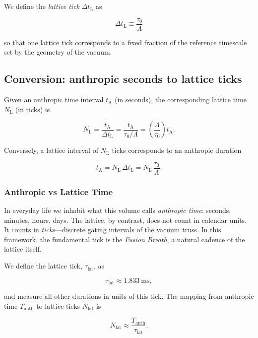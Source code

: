 \documentclass[11pt, letterpaper, openany]{book}
\begin{document}
We define the \emph{lattice tick} $\Delta t_{\text{L}}$ as


\[
\Delta t_{\text{L}} \equiv \frac{\tau_0}{\Lambda}
\]


so that one lattice tick corresponds to a fixed fraction of the reference
timescale set by the geometry of the vacuum.

\subsection{Conversion: anthropic seconds to lattice ticks}

Given an anthropic time interval $t_{\text{A}}$ (in seconds), the corresponding
lattice time $N_{\text{L}}$ (in ticks) is


\[
N_{\text{L}} = \frac{t_{\text{A}}}{\Delta t_{\text{L}}}
             = \frac{t_{\text{A}}}{\tau_0 / \Lambda}
             = \left( \frac{\Lambda}{\tau_0} \right) t_{\text{A}}.
\]



Conversely, a lattice interval of $N_{\text{L}}$ ticks corresponds to an
anthropic duration


\[
t_{\text{A}} = N_{\text{L}} \, \Delta t_{\text{L}}
             = N_{\text{L}} \, \frac{\tau_0}{\Lambda}.
\]

\subsubsection*{Anthropic vs Lattice Time}

In everyday life we inhabit what this volume calls \emph{anthropic time}: 
seconds, minutes, hours, days. The lattice, by contrast, does not count in 
calendar units. It counts in \emph{ticks}---discrete gating intervals of the 
vacuum truss. In this framework, the fundamental tick is the \emph{Fusion Breath}, 
a natural cadence of the lattice itself.

We define the lattice tick, $\tau_{\mathrm{lat}}$, as


\[
  \tau_{\mathrm{lat}} \approx 1.833~\mathrm{ms},
\]


and measure all other durations in units of this tick. The mapping from 
anthropic time $T_{\mathrm{anth}}$ to lattice ticks $N_{\mathrm{lat}}$ is


\[
  N_{\mathrm{lat}} \approx \frac{T_{\mathrm{anth}}}{\tau_{\mathrm{lat}}}.
\]
\end{document}
